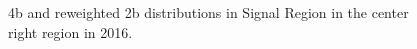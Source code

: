 \begin{figure}[ht]
 

    \caption{4b and reweighted 2b distributions in Signal Region in the center right region in 2016.}
    \label{fig:center-right-4b-SR-2016}
\end{figure}


